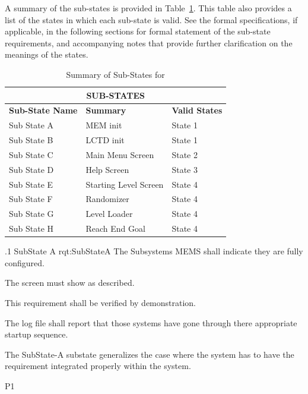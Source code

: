 A summary of the sub-states is provided in Table~\ref{tab:SubStates}.
This table also provides a list of the states in which each sub-state is valid.
See the formal specifications, if applicable, in the following sections for formal statement of the sub-state requirements, and accompanying notes that provide further clarification on the meanings of the states.
\begin{table}[h]
	\begin{center}
		\begin{tabular}{|p{1.0in}|p{4.0in}|p{1.0in}|}
			\hline
			\hline
			\multicolumn{3}{|c|}{{\bf SUB-STATES}} \\
			\hline
				{\bf Sub-State Name} & {\bf Summary} & {\bf Valid States} \\ 
			\hline
			\hline
Sub State A & MEM init & State 1 \\ \hline
Sub State B & LCTD init & State 1 \\ \hline
Sub State C & Main Menu Screen & State 2 \\ \hline
Sub State D & Help Screen & State 3 \\ \hline
Sub State E & Starting Level Screen & State 4 \\ \hline
Sub State F & Randomizer & State 4 \\ \hline
Sub State G & Level Loader & State 4 \\ \hline
Sub State H & Reach End Goal & State 4 \\ 
			\hline
			\hline
		\end{tabular}
		\caption{Summary of Sub-States for \ThisSystem}
		\label{tab:SubStates}
	\end{center}
\end{table}


\ONERQMTV
{\RqtNumberBase.1}
{SubState A}
{rqt:SubStateA}
{The Subsystems MEMS shall indicate they are fully configured.}
{
	\item [Phase 1] The screen must show as described.
}
{This requirement shall be verified by demonstration.}
{
	\item [1] The log file shall report that those systems have gone through there appropriate startup sequence.
}
{
	\item The SubState-A substate generalizes the case where the system has to have the requirement integrated properly within the system.
}
{P1}

